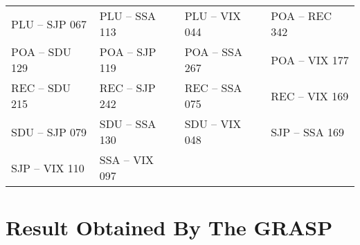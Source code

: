 \documentclass{endm}
\begin{document}
\begin{center}
\begin{longtable}{llll}
\scriptsize PLU – SJP  067 & \scriptsize PLU – SSA  113 & \scriptsize PLU – VIX  044 & \scriptsize POA – REC  342	\\
\scriptsize POA – SDU  129 & \scriptsize POA – SJP  119 & \scriptsize POA – SSA  267 & \scriptsize POA – VIX  177\\	
\scriptsize REC – SDU  215 & \scriptsize REC – SJP  242 & \scriptsize REC – SSA  075 & \scriptsize REC – VIX  169\\	
\scriptsize SDU – SJP  079 & \scriptsize SDU – SSA  130 & \scriptsize SDU – VIX  048 & \scriptsize SJP – SSA  169\\	
\scriptsize SJP – VIX  110 & \scriptsize 	SSA – VIX  097 & & \\


\end{longtable}

\end{center}

\newpage
\section{Result Obtained By The GRASP}
\end{document}
